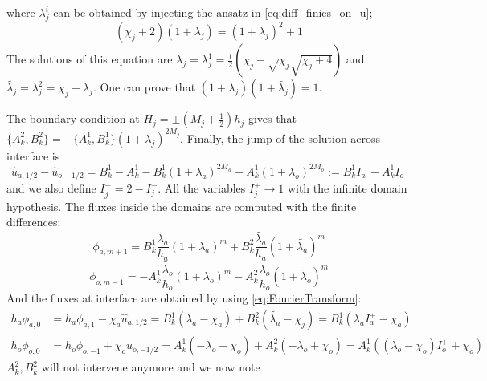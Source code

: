 where $\lambda_j^i$ can be obtained by injecting
the ansatz in \eqref{eq:diff_finies_on_u};
\begin{equation*}
(\chi_j+2) (1+\lambda_j) = (1+\lambda_j)^2 + 1
\end{equation*}
The solutions of this equation are
$\lambda_j = \lambda_j^1 =
\frac{1}{2}\left(\chi_j - \sqrt{\chi_j}\sqrt{\chi_j+4}\right)$ and
$\widetilde{\lambda_j}=\lambda_j^2 = \chi_j - \lambda_j$.
One can prove that $(1+\lambda_j)(1+\widetilde{\lambda_j}) = 1$.
\par
The boundary condition at $H_j = \pm(M_j + \frac{1}{2}) h_j$ gives that
$\{{A}_k^2,{B}_k^2\} = - \{{A}_k^1,{B}_k^1\}
\left(1+\lambda_j\right)^{2 M_j}$.
Finally, the jump of the solution across interface is
\begin{equation*}
\widehat{u}_{a, 1/2} - 
\widehat{u}_{o, -1/2} = B_k^1 - A_k^1
- B_k^1\left(1+\lambda_a\right)^{2M_a}
+ A_k^1\left(1+\lambda_o\right)^{2M_o}
	:= B_k^1 I_a^{-} - A_k^1 I_o^{-}
\end{equation*}
and we also define $I_j^{+} = 2-I_j^{-}$. All the variables
$I_j^{\pm}\rightarrow 1$ with the infinite domain hypothesis.
The fluxes inside the domains are computed
with the finite differences:
\begin{equation}
	\label{eq:OASchwarz_appendix_phiaDiscrete}
\phi_{a,m+1} = B_k^1 \frac{\lambda_a}{h_a}
	(1+\lambda_a)^m + B_k^2 \frac{\widetilde{\lambda_a}}{h_a}
	(1+\widetilde{\lambda_a})^m
\end{equation}
\begin{equation}
	\label{eq:OASchwarz_appendix_phioDiscrete}
\phi_{o,m-1} = -A_k^1 \frac{\widetilde{\lambda_o}}{h_o}
	(1+\lambda_o)^m - A_k^2 \frac{{\lambda_o}}{h_o}
	(1+\widetilde{\lambda_o})^m
\end{equation}
And the fluxes at interface are obtained 
by using \eqref{eq:FourierTransform}:
\begin{equation*}
\begin{aligned}
h_a\phi_{a,0}&= h_a\phi_{a,1} - \chi_a \widehat{u}_{a, 1/2}
= B_k^1 \left(\lambda_a - \chi_a\right) +
	B_k^2\left(\widetilde{\lambda_a} - \chi_j\right)
	= B_k^1 ({\lambda_a} I_a^{+} - \chi_a)
\\
h_o\phi_{o,0}&= h_o\phi_{o,-1} + \chi_o \widehat{u}_{o, -1/2}
	= A_k^1 \left(-\widetilde{\lambda_o} + \chi_o\right) +
	{A}_k^2 \left(-{\lambda_o} + \chi_o\right)
	=A_k^1(({\lambda_o}-\chi_o)I_o^{+} + \chi_o)
\end{aligned}
\end{equation*}
$A_k^2, B_k^2$ will not intervene anymore and we now note
